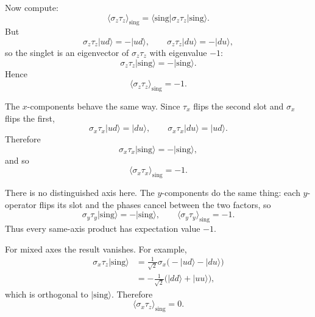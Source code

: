 Now compute:
\begin{equation}
\langle \sigma_z\tau_z\rangle_{\mathrm{sing}}
=
\langle \mathrm{sing}|\sigma_z\tau_z|\mathrm{sing}\rangle.
\end{equation}
But
\begin{equation}
\sigma_z\tau_z|ud\rangle=-|ud\rangle,
\qquad
\sigma_z\tau_z|du\rangle=-|du\rangle,
\end{equation}
so the singlet is an eigenvector of \(\sigma_z\tau_z\) with eigenvalue \(-1\):
\begin{equation}
\sigma_z\tau_z|\mathrm{sing}\rangle=-|\mathrm{sing}\rangle.
\end{equation}
Hence
\begin{equation}
\langle \sigma_z\tau_z\rangle_{\mathrm{sing}}=-1.
\end{equation}

The \(x\)-components behave the same way. Since \(\tau_x\) flips the second slot and \(\sigma_x\) flips the first,
\begin{equation}
\sigma_x\tau_x|ud\rangle=|du\rangle,
\qquad
\sigma_x\tau_x|du\rangle=|ud\rangle.
\end{equation}
Therefore
\begin{equation}
\sigma_x\tau_x|\mathrm{sing}\rangle=-|\mathrm{sing}\rangle,
\end{equation}
and so
\begin{equation}
\langle \sigma_x\tau_x\rangle_{\mathrm{sing}}=-1.
\end{equation}

There is no distinguished axis here. The \(y\)-components do the same thing: each \(y\)-operator flips its slot and the phases cancel between the two factors, so
\begin{equation}
\sigma_y\tau_y|\mathrm{sing}\rangle=-|\mathrm{sing}\rangle,
\qquad
\langle \sigma_y\tau_y\rangle_{\mathrm{sing}}=-1.
\end{equation}
Thus every same-axis product has expectation value \(-1\).

For mixed axes the result vanishes. For example,
\begin{align}
\sigma_x\tau_z|\mathrm{sing}\rangle
&=
\frac{1}{\sqrt2}\sigma_x\bigl(-|ud\rangle-|du\rangle\bigr)
\nonumber\\
&=
-\frac{1}{\sqrt2}\bigl(|dd\rangle+|uu\rangle\bigr),
\end{align}
which is orthogonal to \(|\mathrm{sing}\rangle\). Therefore
\begin{equation}
\langle \sigma_x\tau_z\rangle_{\mathrm{sing}}=0.
\end{equation}

